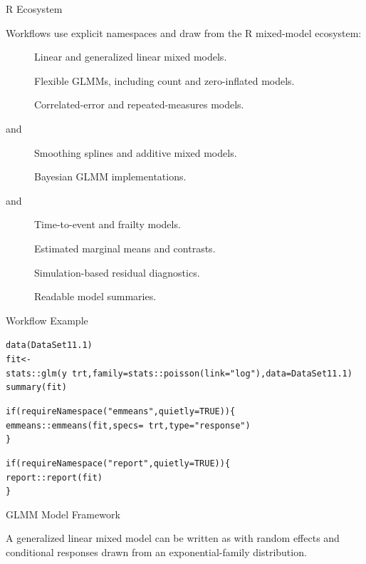 \documentclass[a4paper]{book}
\begin{document}
\begin{Section}{R Ecosystem}

Workflows use explicit namespaces and draw from the R mixed-model ecosystem:
\begin{description}

\item[] Linear and generalized linear mixed models.
\item[] Flexible GLMMs, including count and zero-inflated models.
\item[] Correlated-error and repeated-measures models.
\item[ and ] Smoothing splines and additive mixed models.
\item[] Bayesian GLMM implementations.
\item[ and ] Time-to-event and frailty models.
\item[] Estimated marginal means and contrasts.
\item[] Simulation-based residual diagnostics.
\item[] Readable model summaries.

\end{description}

\end{Section}
%
\begin{Section}{Workflow Example}

\begin{alltt}

data(DataSet11.1)
fit <- stats::glm(y ~ trt, family = stats::poisson(link = "log"), data = DataSet11.1)
summary(fit)

if (requireNamespace("emmeans", quietly = TRUE)) \{
  emmeans::emmeans(fit, specs = ~ trt, type = "response")
\}

if (requireNamespace("report", quietly = TRUE)) \{
  report::report(fit)
\}
\end{alltt}

\end{Section}
%
\begin{Section}{GLMM Model Framework}

A generalized linear mixed model can be written as
with random effects 
and conditional responses drawn from an exponential-family distribution.
\end{Section}
\end{document}
